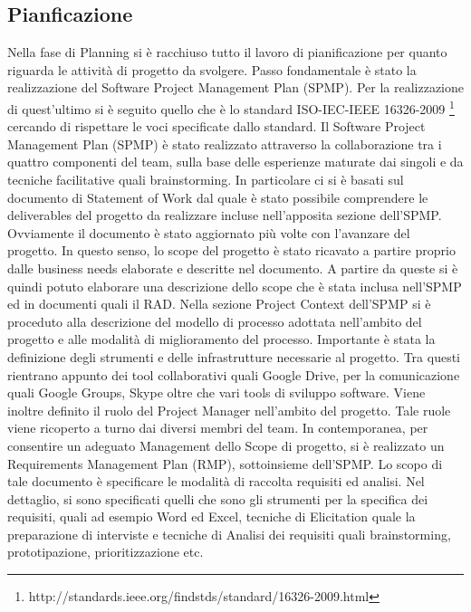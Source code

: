\subsection{Pianficazione}
Nella fase di Planning si \`{e} racchiuso tutto il lavoro di pianificazione per quanto riguarda le attivit\`{a} di progetto da svolgere. Passo fondamentale \`{e} stato la realizzazione del Software Project Management Plan (SPMP). Per la realizzazione di quest\rq ultimo si \`{e} seguito quello che \`{e} lo standard ISO-IEC-IEEE 16326-2009 \footnote{http://standards.ieee.org/findstds/standard/16326-2009.html} cercando di rispettare le voci specificate dallo standard.
Il Software Project Management Plan (SPMP) \`{e} stato realizzato attraverso la collaborazione tra i quattro componenti del team, sulla base delle esperienze maturate dai singoli e da tecniche facilitative quali brainstorming.
In particolare ci si \`{e} basati sul documento di Statement of Work dal quale \`{e} stato possibile comprendere le deliverables del progetto da realizzare incluse nell\rq apposita sezione dell\rq SPMP.
Ovviamente il documento \`{e} stato aggiornato pi\`{u} volte con l\rq avanzare del progetto. In questo senso, lo scope del progetto \`{e} stato ricavato a partire proprio dalle business needs elaborate e descritte nel documento.
A partire da queste si \`{e} quindi potuto elaborare una descrizione dello scope che \`{e} stata inclusa nell\rq SPMP ed in documenti quali il RAD.
Nella sezione Project Context dell\rq SPMP si \`{e} proceduto alla descrizione del modello di processo adottata nell\rq ambito del progetto e alle modalit\`{a} di miglioramento del processo.
Importante \`{e} stata la definizione degli strumenti e delle infrastrutture necessarie al progetto. Tra questi rientrano appunto dei tool collaborativi quali Google Drive, per la comunicazione quali Google Groups, Skype oltre che vari tools di sviluppo software.
Viene inoltre definito il ruolo del Project Manager nell\rq ambito del progetto. Tale ruole viene ricoperto a turno dai diversi membri del team.
In contemporanea, per consentire un adeguato Management dello Scope di progetto, si \`{e} realizzato un Requirements Management Plan (RMP), sottoinsieme dell\rq SPMP. Lo scopo di tale documento \`{e} specificare le modalit\`{a} di raccolta requisiti ed analisi. 
Nel dettaglio, si sono specificati quelli che sono gli strumenti per la specifica dei requisiti, quali ad esempio Word ed Excel, tecniche di Elicitation quale la preparazione di interviste e tecniche di Analisi dei requisiti quali brainstorming, prototipazione, prioritizzazione etc.
